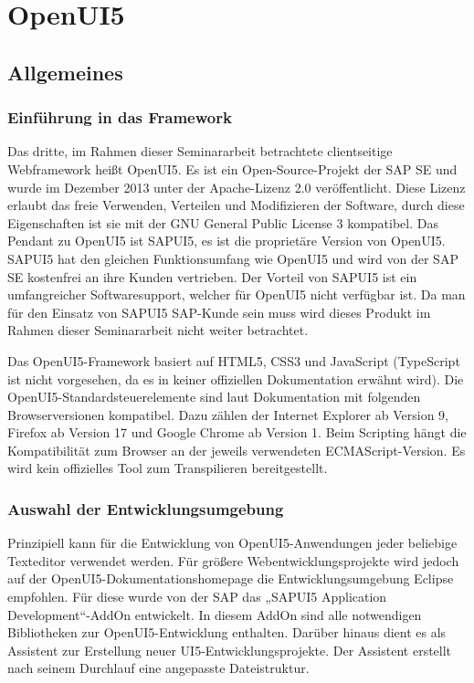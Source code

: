 
\chapter{OpenUI5}
\label{ch:openUI5}

\section{Allgemeines}

\subsection{Einführung in das Framework}\label{sec:oEinf}

Das dritte, im Rahmen dieser Seminararbeit betrachtete clientseitige Webframework heißt OpenUI5. Es ist ein Open-Source-Projekt der SAP SE und wurde im Dezember 2013 unter der Apache-Lizenz 2.0 veröffentlicht. Diese Lizenz erlaubt das freie Verwenden, Verteilen und Modifizieren der Software, durch diese Eigenschaften ist sie mit der GNU General Public License 3 kompatibel. Das Pendant zu OpenUI5 ist SAPUI5, es ist die proprietäre Version von OpenUI5. SAPUI5 hat den gleichen Funktionsumfang wie OpenUI5 und wird von der SAP SE kostenfrei an ihre Kunden vertrieben. Der Vorteil von SAPUI5 ist ein umfangreicher Softwaresupport, welcher für OpenUI5 nicht verfügbar ist. Da man für den Einsatz von SAPUI5 SAP-Kunde sein muss wird dieses Produkt im Rahmen dieser Seminararbeit nicht weiter betrachtet.\autocites[vgl.][8]{Magnucki2017}

Das OpenUI5-Framework basiert auf HTML5, CSS3 und JavaScript (TypeScript ist nicht vorgesehen, da es in keiner offiziellen Dokumentation erwähnt wird). Die OpenUI5-Standardsteuerelemente sind laut Dokumentation mit folgenden Browserversionen kompatibel. Dazu zählen der Internet Explorer ab Version 9, Firefox ab Version 17 und Google Chrome ab Version 1. Beim Scripting hängt die Kompatibilität zum Browser an der jeweils verwendeten ECMAScript-Version. Es wird kein offizielles Tool zum Transpilieren bereitgestellt. \autocites[vgl.][6]{SAP2013}

\subsection{Auswahl der Entwicklungsumgebung}\label{sec:oEntw}

Prinzipiell kann für die Entwicklung von OpenUI5-Anwendungen jeder beliebige Texteditor verwendet werden. Für größere Webentwicklungsprojekte wird jedoch auf der OpenUI5-Dokumentationshomepage die Entwicklungsumgebung Eclipse empfohlen. Für diese wurde von der SAP das „SAPUI5 Application Development“-AddOn entwickelt. In diesem AddOn sind alle notwendigen Bibliotheken zur OpenUI5-Entwicklung enthalten. Darüber hinaus dient es als Assistent zur Erstellung neuer UI5-Entwicklungsprojekte. Der Assistent erstellt nach seinem Durchlauf eine angepasste Dateistruktur.\autocites[vgl.][109\psqq]{Antolovic2014}



